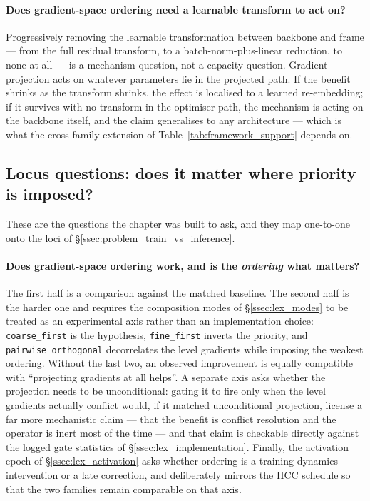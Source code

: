 \paragraph{Does gradient-space ordering need a learnable transform to act on?}
Progressively removing the learnable transformation between backbone and frame
--- from the full residual transform, to a batch-norm-plus-linear reduction, to
none at all --- is a mechanism question, not a capacity question. Gradient
projection acts on whatever parameters lie in the projected path. If the benefit
shrinks as the transform shrinks, the effect is localised to a learned
re-embedding; if it survives with no transform in the optimiser path, the
mechanism is acting on the backbone itself, and the claim generalises to any
architecture --- which is what the cross-family extension of
Table~\ref{tab:framework_support} depends on.

\subsection{Locus questions: does it matter where priority is imposed?}
\label{ssec:design_locus}

These are the questions the chapter was built to ask, and they map one-to-one onto
the loci of \S\ref{ssec:problem_train_vs_inference}.

\paragraph{Does gradient-space ordering work, and is the \emph{ordering} what
matters?} The first half is a comparison against the matched baseline. The second
half is the harder one and requires the composition modes of
\S\ref{ssec:lex_modes} to be treated as an experimental axis rather than an
implementation choice: \texttt{coarse\_first} is the hypothesis,
\texttt{fine\_first} inverts the priority, and \texttt{pairwise\_orthogonal}
decorrelates the level gradients while imposing the weakest ordering. Without the
last two, an observed improvement is equally compatible with ``projecting
gradients at all helps''. A separate axis asks whether the projection needs to be
unconditional: gating it to fire only when the level gradients actually conflict
would, if it matched unconditional projection, license a far more mechanistic
claim --- that the benefit is conflict resolution and the operator is inert most
of the time --- and that claim is checkable directly against the logged gate
statistics of \S\ref{ssec:lex_implementation}. Finally, the activation epoch of
\S\ref{ssec:lex_activation} asks whether ordering is a training-dynamics
intervention or a late correction, and deliberately mirrors the HCC schedule so
that the two families remain comparable on that axis.

